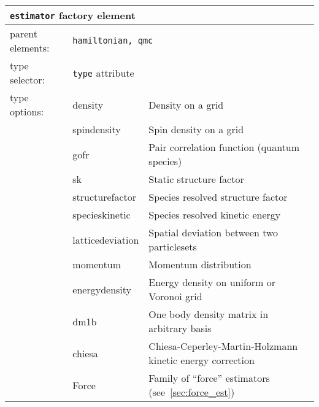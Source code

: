 \FloatBarrier
\begin{table}[h]
\begin{center}
\begin{tabularx}{\textwidth}{l l l l l X }
\hline
\multicolumn{6}{l}{\texttt{estimator} factory element} \\
\hline
\multicolumn{2}{l}{parent elements:} & \multicolumn{4}{l}{\texttt{hamiltonian, qmc}}\\
\multicolumn{2}{l}{type   selector:} & \multicolumn{4}{l}{\texttt{type} attribute}\\
\multicolumn{2}{l}{type   options: } & \multicolumn{2}{l}{density           } & \multicolumn{2}{l}{Density on a grid}\\
\multicolumn{2}{l}{                } & \multicolumn{2}{l}{spindensity       } & \multicolumn{2}{l}{Spin density on a grid}\\
\multicolumn{2}{l}{                } & \multicolumn{2}{l}{gofr              } & \multicolumn{2}{l}{Pair correlation function (quantum species)}\\
\multicolumn{2}{l}{                } & \multicolumn{2}{l}{sk                } & \multicolumn{2}{l}{Static structure factor}\\
\multicolumn{2}{l}{                } & \multicolumn{2}{l}{structurefactor   } & \multicolumn{2}{l}{Species resolved structure factor}\\
\multicolumn{2}{l}{                } & \multicolumn{2}{l}{specieskinetic    } & \multicolumn{2}{l}{Species resolved kinetic energy}\\
\multicolumn{2}{l}{                } & \multicolumn{2}{l}{latticedeviation  } & \multicolumn{2}{l}{Spatial deviation between two particlesets}\\
\multicolumn{2}{l}{                } & \multicolumn{2}{l}{momentum          } & \multicolumn{2}{l}{Momentum distribution}\\
\multicolumn{2}{l}{                } & \multicolumn{2}{l}{energydensity     } & \multicolumn{2}{l}{Energy density on uniform or Voronoi grid}\\
\multicolumn{2}{l}{                } & \multicolumn{2}{l}{dm1b              } & \multicolumn{2}{l}{One body density matrix in arbitrary basis}\\
\multicolumn{2}{l}{                } & \multicolumn{2}{l}{chiesa            } & \multicolumn{2}{l}{Chiesa-Ceperley-Martin-Holzmann kinetic energy correction}\\
\multicolumn{2}{l}{                } & \multicolumn{2}{l}{Force             } & \multicolumn{2}{l}{Family of ``force'' estimators (see~\ref{sec:force_est})}\\

\end{tabularx}
\end{center}
\end{table}
